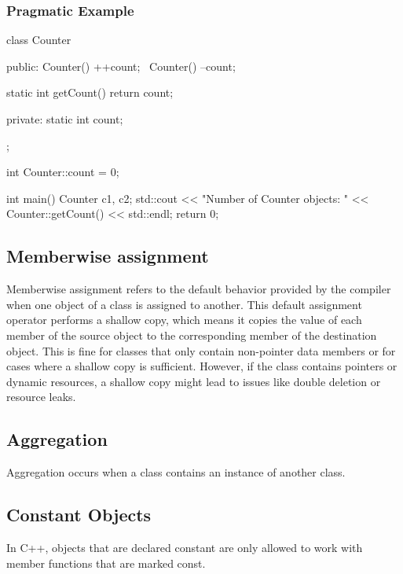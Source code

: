 \documentclass{report}
\begin{document}
\begin{concept}
    \pagebreak 
    \subsubsection{Pragmatic Example}
    \bigbreak \noindent 
    \begin{cppcode}
        class Counter {
            public:
            Counter() { ++count; }
            ~Counter() { --count; }

            static int getCount() { return count; }

            private:
            static int count;
        };

        int Counter::count = 0;

        int main() {
            Counter c1, c2;
            std::cout << "Number of Counter objects: " << Counter::getCount() << std::endl;
            return 0;
        }
    \end{cppcode}

    

    \bigbreak \noindent 
    \subsection{Memberwise assignment}
    \bigbreak \noindent 
    \begin{concept}
        Memberwise assignment refers to the default behavior provided by the compiler when one object of a class is assigned to another. This default assignment operator performs a shallow copy, which means it copies the value of each member of the source object to the corresponding member of the destination object. This is fine for classes that only contain non-pointer data members or for cases where a shallow copy is sufficient. However, if the class contains pointers or dynamic resources, a shallow copy might lead to issues like double deletion or resource leaks.
    \end{concept}


    \bigbreak \noindent 
    \subsection{Aggregation}
    \bigbreak \noindent 
    \begin{concept}
       Aggregation occurs when a class contains an instance of another class. 
    \end{concept}

    \bigbreak \noindent 
    \subsection{Constant Objects}
    \bigbreak \noindent 
    \begin{concept}
       In C++, objects that are declared constant are only allowed to work with member functions that are marked const. 
    \end{concept}
    


\end{concept}
\end{document}
